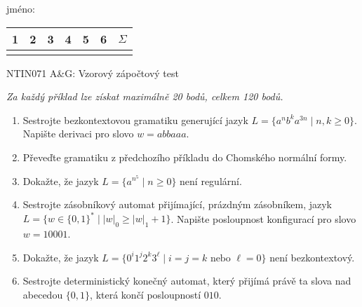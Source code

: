 \documentclass[a4paper,12pt]{article}
\begin{document}
\thispagestyle{empty}

{\Large\sc jméno:}
\hfill
\begin{tabular}{c|c|c|c|c|c||c}
    1 & 2 & 3 & 4 & 5 & 6 & $\Sigma$\\ \hline
      &   &   &   &   &   &
\end{tabular}

\bigskip

\begin{center}
    \large{NTIN071 A\&G: Vzorový zápočtový test}    
\end{center}


{\it Za každý příklad lze získat maximálně 20 bodů, celkem 120 bodů.}

\bigskip

\begin{enumerate}
    \item Sestrojte bezkontextovou gramatiku generující jazyk $L=\{a^nb^ka^{3n}\mid n,k\geq 0\}$. Napište derivaci pro slovo $w=abbaaa$.
    \item Převeďte gramatiku z předchozího příkladu do Chomského normální formy.
    \item Dokažte, že jazyk $L=\{a^{n^5}\mid n\geq 0\}$ není regulární.
    \item Sestrojte zásobníkový automat přijímající, prázdným zásobníkem, jazyk $L=\{w\in\{0,1\}^*\mid |w|_0\geq |w|_1 + 1\}$. Napište posloupnost konfigurací pro slovo $w=10001$.
    \item Dokažte, že jazyk $L=\{0^i1^j2^k3^\ell\mid i=j=k\text{ nebo }\ell=0\}$ není bezkontextový.
    \item Sestrojte deterministický konečný automat, který přijímá právě ta slova nad abecedou $\{0,1\}$, která končí posloupností $010$.
\end{enumerate}
\end{document}
